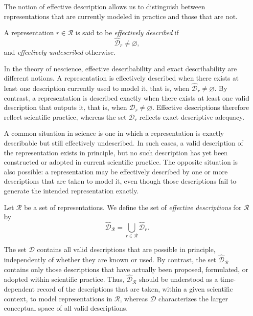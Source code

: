 The notion of effective description allows us to distinguish between representations that are
currently modeled in practice and those that are not.

\begin{definition}
A representation \(r \in \mathcal{R}\) is said to be \emph{effectively described} if
\[
\hat{\mathcal{D}}_r \neq \varnothing,
\]
and \emph{effectively undescribed} otherwise.
\end{definition}

In the theory of nescience, effective describability and exact describability are different notions.
A representation is effectively described when there exists at least one description currently used
to model it, that is, when \(\hat{\mathcal{D}}_r \neq \varnothing\). By contrast, a representation is
described exactly when there exists at least one valid description that outputs it, that is, when
\(\mathcal{D}_r \neq \varnothing\). Effective descriptions therefore reflect scientific practice, whereas
the set \(\mathcal{D}_r\) reflects exact descriptive adequacy.

A common situation in science is one in which a representation is exactly describable but still
effectively undescribed. In such cases, a valid description of the representation exists in principle,
but no such description has yet been constructed or adopted in current scientific practice. The
opposite situation is also possible: a representation may be effectively described by one or more
descriptions that are taken to model it, even though those descriptions fail to generate the intended
representation exactly.

\begin{definition}
Let \(\mathcal{R}\) be a set of representations. We define the set of \emph{effective descriptions}
for \(\mathcal{R}\) by
\[
\hat{\mathcal{D}}_{\mathcal{R}} = \bigcup_{r \in \mathcal{R}} \hat{\mathcal{D}}_r.
\]
\end{definition}

The set \(\mathcal{D}\) contains all valid descriptions that are possible in principle, independently
of whether they are known or used. By contrast, the set \(\hat{\mathcal{D}}_{\mathcal{R}}\) contains only
those descriptions that have actually been proposed, formulated, or adopted within scientific
practice. Thus, \(\hat{\mathcal{D}}_{\mathcal{R}}\) should be understood as a time-dependent record of
the descriptions that are taken, within a given scientific context, to model representations in
\(\mathcal{R}\), whereas \(\mathcal{D}\) characterizes the larger conceptual space of all valid descriptions.

